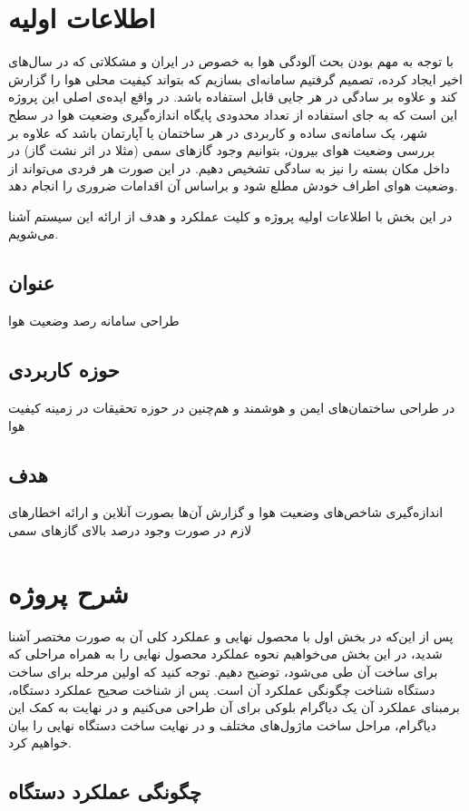\section{اطلاعات اولیه}
با توجه به مهم بودن بحث آلودگی هوا به خصوص در ایران و مشکلاتی که در سال‌های اخیر ایجاد کرده، تصمیم گرفتیم سامانه‌ای بسازیم که بتواند کیفیت محلی هوا را گزارش کند  و علاوه بر سادگی در هر جایی قابل استفاده باشد. در واقع ایده‌ی اصلی این پروژه این است که به جای استفاده از تعداد محدودی پایگاه اندازه‌گیری وضعیت هوا در سطح شهر، یک سامانه‌ی ساده و کاربردی در هر ساختمان یا آپارتمان باشد که علاوه بر بررسی وضعیت هوای بیرون، بتوانیم وجود گاز‌های سمی (مثلا در اثر نشت گاز) در داخل مکان بسته را نیز به سادگی تشخیص دهیم. در این صورت هر فردی می‌تواند از وضعیت هوای اطراف خودش مطلع شود و بر‌اساس آن اقدامات ضروری را انجام دهد. 

در این بخش با اطلاعات اولیه پروژه و کلیت عملکرد و هدف از ارائه این سیستم آشنا می‌شویم. 
\subsection{عنوان}
طراحی سامانه رصد وضعیت هوا
\subsection{حوزه کاربردی}
در طراحی ساختمان‌های ایمن و هوشمند و هم‌چنین در حوزه تحقیقات در زمینه کیفیت هوا
\subsection{هدف}
اندازه‌گیری شاخص‌های وضعیت هوا و گزارش آن‌ها بصورت آنلاین و ارائه اخطار‌های لازم در صورت وجود درصد بالای گاز‌های سمی



\section{شرح پروژه}

پس از این‌که در بخش اول با محصول نهایی و عملکرد کلی آن به صورت مختصر آشنا شدید، در این بخش می‌خواهیم نحوه عملکرد محصول نهایی را به همراه مراحلی که برای ساخت آن طی می‌شود، توضیح دهیم. توجه کنید که اولین مرحله برای ساخت دستگاه شناخت چگونگی عملکرد آن است. پس از شناخت صحیح عملکرد دستگاه، برمبنای عملکرد آن یک دیاگرام بلوکی برای آن طراحی می‌کنیم و در نهایت به کمک این دیاگرام، مراحل ساخت ماژول‌های مختلف و در نهایت ساخت دستگاه نهایی را بیان خواهیم کرد.

\subsection{چگونگی عملکرد دستگاه}

